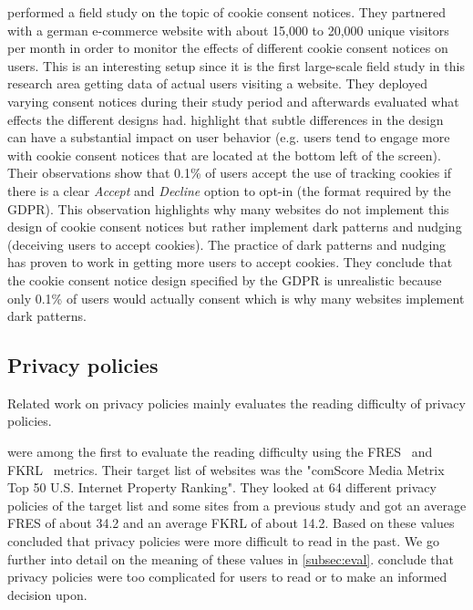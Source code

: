  performed a field study on the topic of cookie consent notices. They partnered with a german
e-commerce website with about 15,000 to 20,000 unique visitors per month in order to monitor the effects of different
cookie consent notices on users. This is an interesting setup since it is the first large-scale field study in this
research area getting data of actual users visiting a website. They deployed varying consent notices during their
study period and afterwards evaluated what effects the different designs had. \citeauthor{utz2019informed} highlight
that subtle differences in the design can have a substantial impact on user behavior (e.g. users tend to engage more
with cookie consent notices that are located at the bottom left of the screen). Their observations show that 0.1\% of
users accept the use of tracking cookies if there is a clear \emph{Accept} and \emph{Decline} option to opt-in (the
format required by the GDPR). This observation highlights why many websites do not implement this design of cookie
consent notices but rather implement dark patterns and nudging (deceiving users to accept cookies). The practice of dark
patterns and nudging has proven to work in getting more users to accept cookies. They conclude that the cookie consent
notice design specified by the GDPR is unrealistic because only 0.1\% of users would actually consent which is why many
websites implement dark patterns.

\subsection{Privacy policies}

Related work on privacy policies mainly evaluates the reading difficulty of privacy policies.

 were among the first to evaluate the reading difficulty using the FRES~\cite{flesch1948new} and
FKRL~\cite{kincaid1975derivation} metrics.
Their target list of websites was the "comScore Media Metrix Top 50 U.S. Internet Property Ranking".
They looked at 64 different privacy policies of the target list and some sites from a previous study and got
an average FRES of about 34.2 and an average FKRL of about 14.2.
Based on these values  concluded that privacy policies were more difficult to read in the past.
We go further into detail on the meaning of these values in \autoref{subsec:eval}. \citeauthor{jensen2004privacy}
conclude that privacy policies were too complicated for users to read or to make an informed decision upon.

